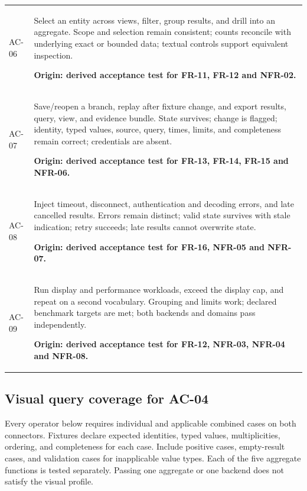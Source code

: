 \documentclass[11pt,a4paper]{article}
\begin{document}
{\begin{longtable}{@{}P{1.35cm}P{14.35cm}@{}}
AC-06 & Select an entity across views, filter, group results, and drill into an aggregate. Scope and selection remain consistent; counts reconcile with underlying exact or bounded data; textual controls support equivalent inspection.\par\smallskip \textbf{Origin: derived acceptance test for FR-11, FR-12 and NFR-02.}\\
AC-07 & Save/reopen a branch, replay after fixture change, and export results, query, view, and evidence bundle. State survives; change is flagged; identity, typed values, source, query, times, limits, and completeness remain correct; credentials are absent.\par\smallskip \textbf{Origin: derived acceptance test for FR-13, FR-14, FR-15 and NFR-06.}\\
AC-08 & Inject timeout, disconnect, authentication and decoding errors, and late cancelled results. Errors remain distinct; valid state survives with stale indication; retry succeeds; late results cannot overwrite state.\par\smallskip \textbf{Origin: derived acceptance test for FR-16, NFR-05 and NFR-07.}\\
AC-09 & Run display and performance workloads, exceed the display cap, and repeat on a second vocabulary. Grouping and limits work; declared benchmark targets are met; both backends and domains pass independently.\par\smallskip \textbf{Origin: derived acceptance test for FR-12, NFR-03, NFR-04 and NFR-08.}\\
\end{longtable}}

\subsection{Visual query coverage for AC-04}
Every operator below requires individual and applicable combined cases on both connectors. Fixtures declare expected identities, typed values, multiplicities, ordering, and completeness for each case. Include positive cases, empty-result cases, and validation cases for inapplicable value types. Each of the five aggregate functions is tested separately. Passing one aggregate or one backend does not satisfy the visual profile.
\end{document}

